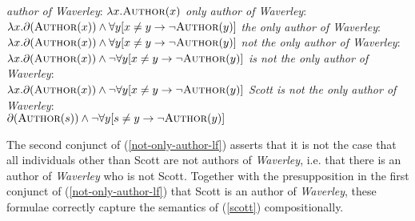 \begin{exe}
	\ex \label{author-lf} \textit{author of Waverley}: $\lambda x . \textsc{Author}(x)$
	\ex \textit{only author of Waverley}: $\lambda x . \partial(\textsc{Author}(x)) \land \forall y [ x \ne y \to \neg \textsc{Author}(y) ]$
	\ex \textit{the only author of Waverley}: $\lambda x . \partial(\textsc{Author}(x)) \land \forall y [ x \ne y \to \neg \textsc{Author}(y) ]$
	\ex \textit{not the only author of Waverley}: \\ $\lambda x . \partial(\textsc{Author}(x)) \land \neg  \forall y [ x \ne y \to \neg \textsc{Author}(y) ]$
	\ex \textit{is not the only author of Waverley}: \\ $\lambda x . \partial(\textsc{Author}(x)) \land \neg  \forall y [ x \ne y \to \neg \textsc{Author}(y) ]$
	\ex \label{not-only-author-lf} \textit{Scott is not the only author of Waverley}: \\ $\partial(\textsc{Author}(s)) \land \neg \forall y [ s \ne y \to \neg \textsc{Author}(y) ]$
\end{exe}

The second conjunct of (\ref{not-only-author-lf}) asserts that it is not the case that all individuals other than Scott are not authors of \textit{Waverley}, i.e. that there is an author of \textit{Waverley} who is not Scott. Together with the presupposition in the first conjunct of (\ref{not-only-author-lf}) that Scott is an author of \textit{Waverley}, these formulae correctly capture the semantics of (\ref{scott}) compositionally.